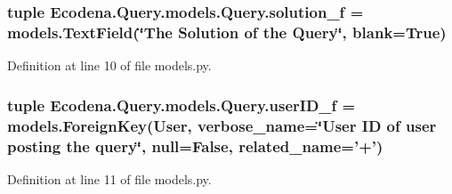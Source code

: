 \hypertarget{class_ecodena_1_1_query_1_1models_1_1_query_aa5784dfc285de57ac58e20358ec86136}{
\subsubsection[{solution\_\-f}]{\setlength{\rightskip}{0pt plus 5cm}tuple {\bf Ecodena.Query.models.Query.solution\_\-f} = models.TextField(\char`\"{}The Solution of the {\bf Query}\char`\"{}, blank=True)}}
\label{de/d81/class_ecodena_1_1_query_1_1models_1_1_query_aa5784dfc285de57ac58e20358ec86136}


Definition at line 10 of file models.py.

\hypertarget{class_ecodena_1_1_query_1_1models_1_1_query_af6d91b41546f1d338987e4072357700c}{
\subsubsection[{userID\_\-f}]{\setlength{\rightskip}{0pt plus 5cm}tuple {\bf Ecodena.Query.models.Query.userID\_\-f} = models.ForeignKey(User, verbose\_\-name=\char`\"{}User ID of user posting the query\char`\"{}, null=False, related\_\-name='+')}}
\label{de/d81/class_ecodena_1_1_query_1_1models_1_1_query_af6d91b41546f1d338987e4072357700c}


Definition at line 11 of file models.py.

\hypertarget{class_ecodena_1_1_query_1_1models_1_1_query_a7aca73a76e3660ca990174870404f804}{
\subsubsection[{userID\_\-f}]{}}
\label{de/d81/class_ecodena_1_1_query_1_1models_1_1_query_a7aca73a76e3660ca990174870404f804}


